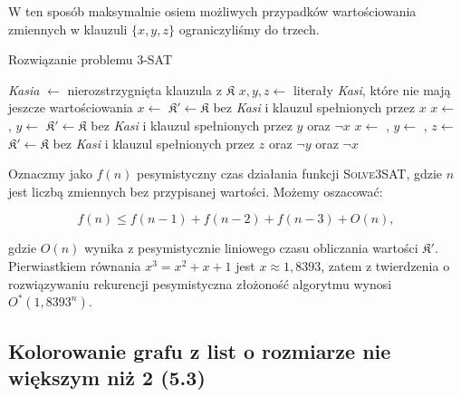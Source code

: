 W ten sposób maksymalnie osiem możliwych przypadków wartościowania zmiennych w klauzuli $\{x, y, z\}$ ograniczyliśmy do trzech. 

\begin{algorithm}[H]
	\caption{Rozwiązanie problemu 3-SAT}
	\begin{algorithmic}[1]
		\State \Return \true
		\EndIf
		
		\State 
		\State \textit{Kasia} $\gets$ nierozstrzygnięta klauzula z $\mathfrak{K}$ 
		\State \Return \false
		\EndIf
		\State $x, y, z \gets $ literały \textit{Kasi}, które nie mają jeszcze wartościowania
		\State
		\State $x \gets $ \true
		\State $\mathfrak{K}' \gets \mathfrak{K}$ bez \textit{Kasi} i klauzul spełnionych przez $x$
		\State \Return \true
		\EndIf
		\State
		\State $x \gets $ \false, $y \gets $ \true {}
		\State $\mathfrak{K}' \gets \mathfrak{K}$ bez \textit{Kasi} i klauzul spełnionych przez $y$ oraz $\lnot x$
		\State \Return \true
		\EndIf
		\State
		\State $x \gets $ \false, $y \gets $ \false, $z \gets $ \true {}
		\State $\mathfrak{K}' \gets \mathfrak{K}$ bez \textit{Kasi} i klauzul spełnionych przez $z$ oraz $\lnot y$ oraz $\lnot x$
		\State \Return \true
		\EndIf
		\EndProcedure
	\end{algorithmic}
\end{algorithm}

Oznaczmy jako $f(n)$ pesymistyczny czas działania funkcji \textsc{Solve3SAT}, gdzie $n$ jest liczbą zmiennych bez przypisanej wartości. Możemy oszacować:

\[
f(n) \leq f(n-1) + f(n-2) + f(n-3) + O(n),
\]

gdzie $O(n)$ wynika z pesymistycznie liniowego czasu obliczania wartości $\mathfrak{K}'$. Pierwiastkiem równania
$x^3 = x^2 + x + 1$
jest $x \approx 1{,}8393$, zatem z twierdzenia o rozwiązywaniu rekurencji pesymistyczna złożoność algorytmu wynosi $O^*(1{,}8393^n)$.

\subsection{Kolorowanie grafu z list o rozmiarze nie większym niż 2 (5.3)}
